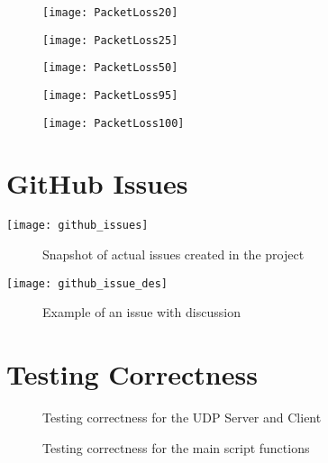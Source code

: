 \begin{appendices}
\begin{figure}[!htb]
  \texttt{[image: PacketLoss20]}
  \caption{}
\endminipage\hfill
{}
  \texttt{[image: PacketLoss25]}
 \caption{}
\endminipage\hfill
{}
  \texttt{[image: PacketLoss50]}
  \caption{}
\endminipage
\end{figure}

\begin{figure}[!htb]
  	\texttt{[image: PacketLoss95]}
  	\caption{}
\endminipage\hfill
{}
  	\texttt{[image: PacketLoss100]}
  	\caption{}
\endminipage\hfill
{}
  	\hfill
\endminipage
\end{figure}

%
\chapter{GitHub Issues}
\begin{center}
	\label{ref:GitHubAppendix}
	\texttt{[image: github\_issues]}
	\begin{figure}[h]
		\caption{Snapshot of actual issues created in the project}
		\label{ref:GitHubIssues}
	\end{figure}			
\end{center}

\begin{center}
	\texttt{[image: github\_issue\_des]}
	\begin{figure}[h]
		\caption{Example of an issue with discussion}
		\label{ref:GitHubIssueExample}
	\end{figure}	
\end{center}

%
\chapter{Testing Correctness}
\begin{center}
	\label{ref:testingCorrect}
	
	\begin{figure}[h]
		\caption{Testing correctness for the UDP Server and Client}
		\label{ref:testingUDP}
	\end{figure}
	
		
	\begin{figure}[h]
		\caption{Testing correctness for the main script functions}	
		\label{ref:testingScript}
	\end{figure}
\end{center}
\end{appendices}
